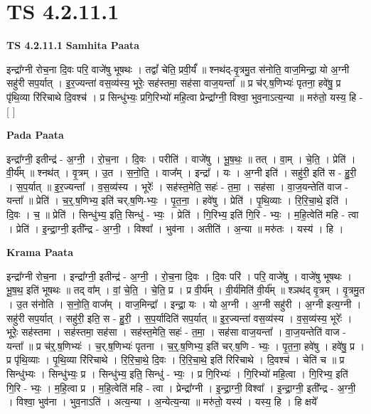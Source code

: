 \documentclass[17pt]{extarticle}
\begin{document}
\section{ TS 4.2.11.1 }

\textbf{TS 4.2.11.1 } \newline
\textbf{Samhita Paata} \newline

इन्द्रा᳚ग्नी रोच॒ना दि॒वः परि॒ वाजे॑षु भूषथः । तद्वां᳚ चेति॒ प्रवी॒र्यं᳚ ॥ श्नथ॑द्-वृ॒त्रमु॒त स॑नोति॒ वाज॒मिन्द्रा॒ यो अ॒ग्नी सहु॑री सप॒र्यात् । इ॒र॒ज्यन्ता॑ वस॒व्य॑स्य॒ भूरेः॒ सह॑स्तमा॒ सह॑सा वाज॒यन्ता᳚ ॥ प्र च॑र्.ष॒णिभ्यः॑ पृतना॒ हवे॑षु॒ प्र पृ॑थि॒व्या रि॑रिचाथे दि॒वश्च॑ । प्र सिन्धु॑भ्यः॒ प्रगि॒रिभ्यो॑ महि॒त्वा प्रेन्द्रा᳚ग्नी॒ विश्वा॒ भुव॒नाऽत्य॒न्या ॥ मरु॑तो॒ यस्य॒ हि - [  ] \newline

\textbf{Pada Paata} \newline

इन्द्रा᳚ग्नी॒ इतीन्द्र॑ - अ॒ग्नी॒ । रो॒च॒ना । दि॒वः । परीति॑ । वाजे॑षु । भू॒ष॒थः॒ ॥ तत् । वा॒म् । चे॒ति॒ । प्रेति॑ । वी॒र्य᳚म् ॥ श्नथ॑त् । वृ॒त्रम् । उ॒त । स॒नो॒ति॒ । वाज᳚म् । इन्द्रा᳚ । यः । अ॒ग्नी इति॑ । सहु॑री॒ इति॑ स - हु॒री॒ । स॒प॒र्यात् ॥ इ॒र॒ज्यन्ता᳚ । व॒स॒व्य॑स्य । भूरेः᳚ । सह॑स्त॒मेति॒ सहः॑ - त॒मा॒ । सह॑सा । वा॒ज॒यन्तेति॑ वाज - यन्ता᳚ ॥ प्रेति॑ । च॒र्॒.ष॒णिभ्य॒ इति॑ चर्.ष॒णि-भ्यः॒ । पृ॒त॒ना॒ । हवे॑षु । प्रेति॑ । पृ॒थि॒व्याः । रि॒रि॒चा॒थे॒ इति॑ । दि॒वः । च॒ ॥ प्रेति॑ । सिन्धु॑भ्य॒ इति॒ सिन्धु॑ - भ्यः॒ । प्रेति॑ । गि॒रिभ्य॒ इति॑ गि॒रि - भ्यः॒ । म॒हि॒त्वेति॑ महि - त्वा । प्रेति॑ । इ॒न्द्रा॒ग्नी॒ इती᳚न्द्र - अ॒ग्नी॒ । विश्वा᳚ । भुव॑ना । अतीति॑ । अ॒न्या ॥ मरु॑तः । यस्य॑ । हि ।  \newline


\textbf{Krama Paata} \newline

इन्द्रा᳚ग्नी रोच॒ना । इन्द्रा᳚ग्नी॒ इतीन्द्र॑ - अ॒ग्नी॒ । रो॒च॒ना दि॒वः । दि॒वः परि॑ । परि॒ वाजे॑षु । वाजे॑षु भूषथः । भू॒ष॒थ॒ इति॑ भूषथः ॥ तद् वा᳚म् । वां॒ चे॒ति॒ । चे॒ति॒ प्र । प्र वी॒र्य᳚म् । वी॒र्य॑मिति॑ वी॒र्य᳚म् ॥ श्ञथ॑द् वृ॒त्रम् । वृ॒त्रमु॒त । उ॒त स॑नोति । स॒नो॒ति॒ वाज᳚म् । वाज॒मिन्द्रा᳚ । इन्द्रा॒ यः । यो अ॒ग्नी । अ॒ग्नी सहु॑री । अ॒ग्नी इत्य॒ग्नी । सहु॑री सप॒र्यात् । सहु॑री॒ इति॒ स - हु॒री॒ । स॒प॒र्यादिति॑ सप॒र्यात् ॥ इ॒र॒ज्यन्ता॑ वस॒व्य॑स्य । व॒स॒व्य॑स्य॒ भूरेः᳚ । भूरेः॒ सह॑स्तमा । सह॑स्तमा॒ सह॑सा । सह॑स्त॒मेति॒ सहः॑ - त॒मा॒ । सह॑सा वाज॒यन्ता᳚ । वा॒ज॒यन्तेति॑ वाज - यन्ता᳚ ॥ प्र च॑र्॒.ष॒णिभ्यः॑ । च॒र्.ष॒णिभ्यः॑ पृतना । च॒र्॒.ष॒णिभ्य॒ इति॑ चर्.ष॒णि - भ्यः॒ । पृ॒त॒ना॒ हवे॑षु । हवे॑षु॒ प्र । प्र पृ॑थि॒व्याः । पृ॒थि॒व्या रि॑रिचाथे । रि॒रि॒चा॒थे॒ दि॒वः । रि॒रि॒चा॒थे॒ इति॑ रिरिचाथे । दि॒वश्च॑ । चेति॑ च ॥ प्र सिन्धु॑भ्यः । सिन्धु॑भ्यः॒ प्र । सिन्धु॑भ्य॒ इति॒ सिन्धु॑ - भ्यः॒ । प्र गि॒रिभ्यः॑ । गि॒रिभ्यो॑ महि॒त्वा । गि॒रिभ्य॒ इति॑ गि॒रि - भ्यः॒ । म॒हि॒त्वा प्र । म॒हि॒त्वेति॑ महि - त्वा । प्रेन्द्रा᳚ग्नी । इ॒न्द्रा॒ग्नी॒ विश्वा᳚ । इ॒न्द्रा॒ग्नी॒ इती᳚न्द्र - अ॒ग्नी॒ । विश्वा॒ भुव॑ना । भुव॒नाऽति॑ । अत्य॒न्या । अ॒न्येत्य॒न्या ॥ मरु॑तो॒ यस्य॑ । यस्य॒ हि । हि क्षये᳚ \newline
\end{document}
